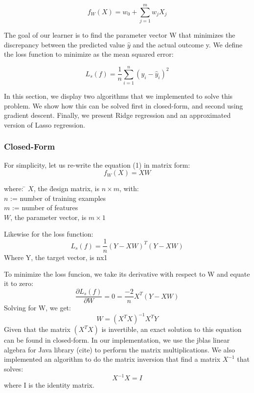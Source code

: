 \documentclass[conference,compsoc]{IEEEtran}
\begin{document}
\begin{equation}
f_{W}(X) = w_{0} +  \sum_{j=1}^m w_{j}X_{j}
\end{equation} 

The goal of our learner is to find the parameter vector W that minimizes the discrepancy between the predicted value $\hat{y}$ and the actual outcome y. We define the loss function to minimize as the mean squared error:

\begin{equation}
L_{s}(f) = \frac{1}{n} \sum_{i=1}^n (y_{i} - \hat{y}_{i})^2
\end{equation}

In this section, we display two algorithms that we implemented to solve this problem. We show how this can be solved first in closed-form, and second using gradient descent. Finally, we present Ridge regression and an approximated version of Lasso regression.

\subsubsection{Closed-Form}

For simplicity, let us re-write the equation (1) in matrix form:
\begin{equation}
f_{W}(X) = XW
\end{equation}
\begin{tabbing}
	where: \= $X$, the \= design matrix, is $n \times m$, with: \+\+ \\ $n$ := number of  training examples \\ $m$ := number of features \-\\
	$W$, the parameter vector, is $m \times 1$
\end{tabbing} 
Likewise for the loss function: 
\begin{equation}
L_{s}(f) = \frac{1}{n} (Y- XW)^T(Y-XW)
\end{equation}
Where Y, the target vector, is nx1

To minimize the loss funcion, we take its derivative with respect to W and equate it to zero: 
\begin{equation}\label{eq:gradient}
\frac{\partial L_{s}(f)}{\partial W} = 0 = \frac{-2}{n} X^T(Y-XW)
\end{equation} 
Solving for W, we get:
\begin{equation}
W = (X^TX)^{-1}X^TY
\end{equation}
Given that the matrix $(X^TX)$ is invertible, an exact solution to this equation can be found in closed-form. In our implementation, we use the jblas linear algebra for Java library (cite) to perform the matrix multiplications. We also implemented an algorithm to do the matrix inversion that find a matrix $X^{-1}$ that solves:
\begin{equation}
X^{-1}X = I
\end{equation} 
where I is the identity matrix.
\end{document}
